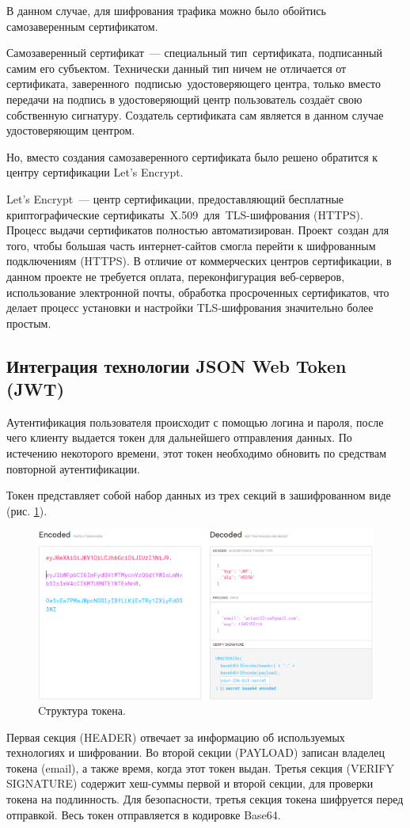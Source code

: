 \documentclass[14pt, a4paper]{extarticle}
\begin{document}
    В данном случае, для шифрования трафика можно было обойтись самозаверенным сертификатом.

    Самозаверенный сертификат — специальный тип сертификата, подписанный самим его субъектом. Технически данный тип ничем не отличается от сертификата, заверенного подписью удостоверяющего центра, только вместо передачи на подпись в удостоверяющий центр пользователь создаёт свою собственную сигнатуру. Создатель сертификата сам является в данном случае удостоверяющим центром.

    Но, вместо создания самозаверенного сертификата было решено обратится к центру сертификации Let’s Encrypt.

    Let’s Encrypt — центр сертификации, предоставляющий бесплатные криптографические сертификаты X.509 для TLS-шифрования (HTTPS). Процесс выдачи сертификатов полностью автоматизирован. Проект создан для того, чтобы большая часть интернет-сайтов смогла перейти к шифрованным подключениям (HTTPS). В отличие от коммерческих центров сертификации, в данном проекте не требуется оплата, переконфигурация веб-серверов, использование электронной почты, обработка просроченных сертификатов, что делает процесс установки и настройки TLS-шифрования значительно более простым.


    \clearpage
    \subsection{Интеграция технологии JSON Web Token (JWT)}
    Аутентификация пользователя происходит с помощью логина и пароля, после чего клиенту выдается токен для дальнейшего отправления данных. По истечению некоторого времени, этот токен необходимо обновить по средствам повторной аутентификации.

    Токен представляет собой набор данных из трех секций в зашифрованном виде (рис. \ref{fig:token1}).

    \begin{figure}[h]
        \centering
        \includegraphics[width=1\linewidth]{img/token1.png}
        \caption{Cтруктура токена.}
        \label{fig:token1}
    \end{figure}
    Первая секция (HEADER) отвечает за информацию об используемых технологиях и шифровании. Во второй секции (PAYLOAD) записан владелец токена (email), а также время, когда этот токен выдан. Третья секция (VERIFY SIGNATURE) содержит хеш-суммы первой и второй секции, для проверки токена на подлинность. Для безопасности, третья секция токена шифруется перед отправкой. Весь токен отправляется в кодировке Base64.
\end{document}
